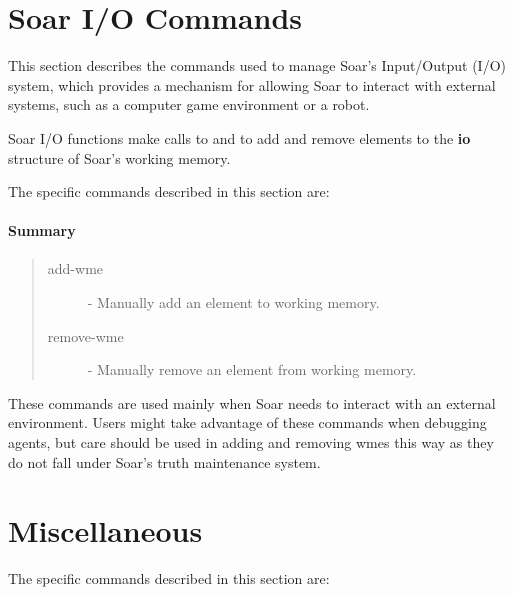 \section{Soar I/O Commands}
\label{SOAR-IO}

This section describes the commands used to manage Soar's Input/Output
(I/O) system, which provides a mechanism for allowing Soar to interact 
with external systems, such as a computer game environment or a robot.  

Soar I/O functions make calls to  and 
to add and remove elements to the \textbf{io} structure of Soar's working
memory. 
 
The specific commands described in this section are:

\paragraph{Summary}
\begin{quote}
\begin{description}
\item[add-wme] - Manually add an element to working memory.
\item[remove-wme] - Manually remove an element from working memory.
\end{description}
\end{quote}

These commands are used mainly  when Soar needs to interact with an
external environment.  Users might take advantage of these commands when
debugging agents, but care should be used in adding and removing wmes this
way as they do not fall under Soar's truth maintenance system.




\section{Miscellaneous}
\label{MISC}



The specific commands described in this section are:


